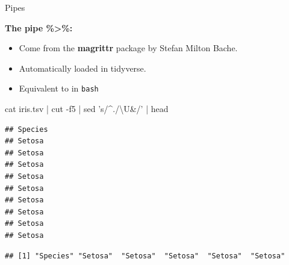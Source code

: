 \documentclass[14pt,ignorenonframetext,]{bredelebeamer}
\newenvironment{Shaded}{\begin{snugshade}}{\end{snugshade}}
\newcommand{\KeywordTok}[1]{\textcolor[rgb]{0.94,0.87,0.69}{#1}}
\newcommand{\DataTypeTok}[1]{\textcolor[rgb]{0.87,0.87,0.75}{#1}}
\newcommand{\DecValTok}[1]{\textcolor[rgb]{0.86,0.86,0.80}{#1}}
\newcommand{\StringTok}[1]{\textcolor[rgb]{0.80,0.58,0.58}{#1}}
\newcommand{\FunctionTok}[1]{\textcolor[rgb]{0.94,0.94,0.56}{#1}}
\newcommand{\OperatorTok}[1]{\textcolor[rgb]{0.94,0.94,0.82}{#1}}
\newcommand{\NormalTok}[1]{\textcolor[rgb]{0.80,0.80,0.80}{#1}}
\providecommand{\tightlist}{%
  \setlength{\itemsep}{0pt}\setlength{\parskip}{0pt}}
\begin{document}
\begin{frame}[fragile]{Pipes}

\textbf{The pipe \%\textgreater{}\%:}

\begin{itemize}
\tightlist
\item
  Come from the \textbf{magrittr} package by Stefan Milton Bache.
\item
  Automatically loaded in tidyverse.
\item
  Equivalent to \texttt{\textbar{}} in \texttt{bash}
\end{itemize}

\begin{Shaded}
\begin{Highlighting}[]
\FunctionTok{cat}\NormalTok{ iris.tsv }\KeywordTok{|} \FunctionTok{cut}\NormalTok{ -f5 }\KeywordTok{|} \FunctionTok{sed} \StringTok{'s/^./\textbackslash{}U&/'} \KeywordTok{|} \FunctionTok{head}
\end{Highlighting}
\end{Shaded}

\begin{verbatim}
## Species
## Setosa
## Setosa
## Setosa
## Setosa
## Setosa
## Setosa
## Setosa
## Setosa
## Setosa
\end{verbatim}

\begin{Shaded}
\end{Shaded}

\begin{verbatim}
## [1] "Species" "Setosa"  "Setosa"  "Setosa"  "Setosa"  "Setosa"
\end{verbatim}

\end{frame}
\end{document}
